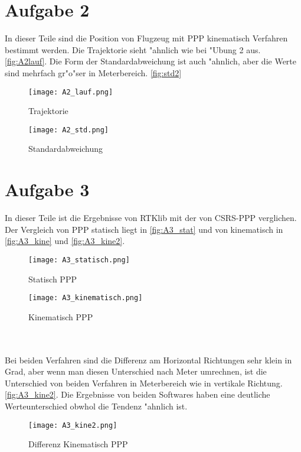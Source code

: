 \section{Aufgabe 2}
In dieser Teile sind die Position von Flugzeug mit PPP kinematisch Verfahren bestimmt werden. Die Trajektorie sieht "ahnlich wie bei "Ubung 2 aus. \autoref{fig:A2lauf}. Die Form der Standardabweichung ist auch "ahnlich, aber die Werte sind mehrfach gr"o"ser in Meterbereich. \autoref{fig:std2}
\begin{figure}[ht]\centering 
	\texttt{[image: A2\_lauf.png]}
	\caption{Trajektorie}
	\label{fig:A2lauf}
\end{figure}
\begin{figure}[ht]\centering 
	\texttt{[image: A2\_std.png]}
	\caption{Standardabweichung}
	\label{fig:std2}
\end{figure}
\clearpage


\section{Aufgabe 3}
In dieser Teile ist die Ergebnisse von RTKlib mit der von CSRS-PPP verglichen. Der Vergleich von PPP statisch liegt in \autoref{fig:A3_stat} und von kinematisch in \autoref{fig:A3_kine} und \autoref{fig:A3_kine2}.
\begin{figure}[ht]\centering 
	\texttt{[image: A3\_statisch.png]}
	\caption{Statisch PPP}
	\label{fig:A3_stat}
\end{figure}
\begin{figure}[ht]\centering 
	\texttt{[image: A3\_kinematisch.png]}
	\caption{Kinematisch PPP}
	\label{fig:A3_kine}
\end{figure}\\\\
Bei beiden Verfahren sind die Differenz am Horizontal Richtungen sehr klein in Grad, aber wenn man diesen Unterschied nach Meter umrechnen, ist die Unterschied von beiden Verfahren in Meterbereich wie in vertikale Richtung.\autoref{fig:A3_kine2}. Die Ergebnisse von beiden Softwares haben eine deutliche Werteunterschied obwhol die Tendenz "ahnlich ist. 
\begin{figure}[ht]\centering 
	\texttt{[image: A3\_kine2.png]}
	\caption{Differenz Kinematisch PPP}
	\label{fig:A3_kine2}
\end{figure}